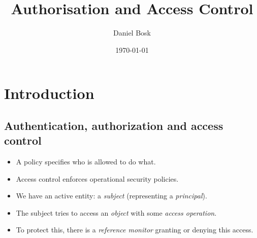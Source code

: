 \title{%
  Authorisation and Access Control
}
\author{Daniel Bosk}
\date{\today}

\mode*

\begin{frame}
  \titlepage{}
\end{frame}

\begin{frame}
  \tableofcontents
\end{frame}




\section{Introduction}

\subsection{Authentication, authorization and access control}

\begin{frame}
  \begin{itemize}
    \item A policy specifies who is allowed to do what.

    \item Access control enforces operational security policies.
  \end{itemize}
\end{frame}

\begin{frame}
  \begin{definition}
    \begin{itemize}
      \item We have an active entity: a \emph{subject} (representing 
        a \emph{principal}).

      \item The subject tries to access an \emph{object} with some \emph{access 
          operation}.

      \item To protect this, there is a \emph{reference monitor} granting or 
        denying this access.
    \end{itemize}
  \end{definition}
\end{frame}

